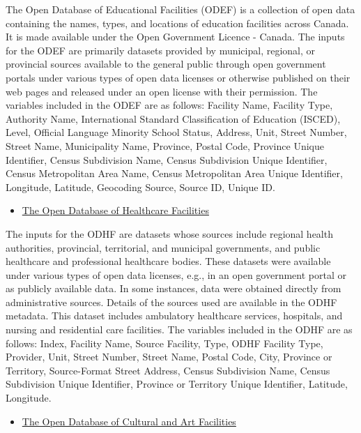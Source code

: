 \documentclass[
11pt, %
oneside, %
english, %
singlespacing, %
]{macthesis} %
\def\tightlist{}
\begin{document}
The Open Database of Educational Facilities (ODEF) is a collection of open data containing the names, types, and locations of education facilities across Canada. It is made available under the Open Government Licence - Canada. The inputs for the ODEF are primarily datasets provided by municipal, regional, or provincial sources available to the general public through open government portals under various types of open data licenses or otherwise published on their web pages and released under an open license with their permission. The variables included in the ODEF are as follows: Facility Name, Facility Type, Authority Name, International Standard Classification of Education (ISCED), Level, Official Language Minority School Status, Address, Unit, Street Number, Street Name, Municipality Name, Province, Postal Code, Province Unique Identifier, Census Subdivision Name, Census Subdivision Unique Identifier, Census Metropolitan Area Name, Census Metropolitan Area Unique Identifier, Longitude, Latitude, Geocoding Source, Source ID, Unique ID.

\begin{itemize}
\tightlist
\item
  \href{https://www.statcan.gc.ca/en/lode/databases/odhf}{The Open Database of Healthcare Facilities}
\end{itemize}

The inputs for the ODHF are datasets whose sources include regional health authorities, provincial, territorial, and municipal governments, and public healthcare and professional healthcare bodies. These datasets were available under various types of open data licenses, e.g., in an open government portal or as publicly available data. In some instances, data were obtained directly from administrative sources. Details of the sources used are available in the ODHF metadata. This dataset includes ambulatory healthcare services, hospitals, and nursing and residential care facilities. The variables included in the ODHF are as follows: Index, Facility Name, Source Facility, Type, ODHF Facility Type, Provider, Unit, Street Number, Street Name, Postal Code, City, Province or Territory, Source-Format Street Address, Census Subdivision Name, Census Subdivision Unique Identifier, Province or Territory Unique Identifier, Latitude, Longitude.

\begin{itemize}
\tightlist
\item
  \href{https://www.statcan.gc.ca/en/lode/databases/odcaf}{The Open Database of Cultural and Art Facilities}
\end{itemize}
\end{document}
